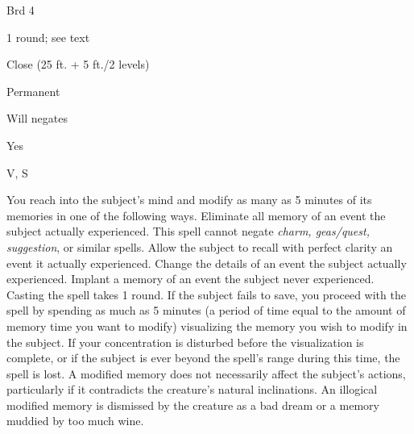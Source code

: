 
\begin{description*}
\item[Level:] Brd 4
\item[Casting Time:] 1 round; see text
\item[Range:] Close (25 ft. + 5 ft./2 levels)
\item[Duration:] Permanent
\item[Saving Throw:] Will negates
\item[Spell Resistance:] Yes
\item[Components:] V, S
\end{description*}

You reach into the subject's mind and modify as many as 5 minutes of its memories
in one of the following ways.%
Eliminate all memory of an event the subject actually experienced. This spell cannot
negate \textit{charm, geas/quest, suggestion}, or similar spells.%
Allow the subject to recall with perfect clarity an event it actually experienced.%
Change the details of an event the subject actually experienced.%
Implant a memory of an event the subject never experienced.
Casting the spell takes 1 round. If the subject fails to save, you proceed with
the spell by spending as much as 5 minutes (a period of time equal to the amount
of memory time you want to modify) visualizing the memory you wish to modify in
the subject. If your concentration is disturbed before the visualization is complete,
or if the subject is ever beyond the spell's range during this time, the spell
is lost.
A modified memory does not necessarily affect the subject's actions, particularly
if it contradicts the creature's natural inclinations. An illogical modified memory
is dismissed by the creature as a bad dream or a memory muddied by too much wine.